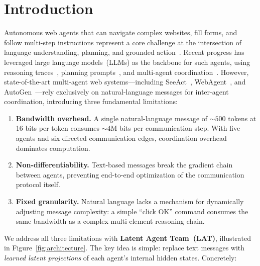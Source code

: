 \documentclass{article}
\newcommand{\ours}{\textsc{LAT}}
\begin{document}
\section{Introduction}
\label{sec:intro}

Autonomous web agents that can navigate complex websites, fill forms, and follow multi-step instructions represent a core challenge at the intersection of language understanding, planning, and grounded action~\cite{deng2024mind2web,zhou2024webarena}.
Recent progress has leveraged large language models~(LLMs) as the backbone for such agents, using reasoning traces~\cite{yao2023react}, planning prompts~\cite{wang2023plan}, and multi-agent coordination~\cite{wu2023autogen,hong2023metagpt}.
However, state-of-the-art multi-agent web systems---including SeeAct~\cite{zheng2024seeact}, WebAgent~\cite{gur2024webagent}, and AutoGen~\cite{wu2023autogen}---rely exclusively on natural-language messages for inter-agent coordination, introducing three fundamental limitations:

\begin{enumerate}[leftmargin=*,itemsep=1pt,topsep=2pt]
\item \textbf{Bandwidth overhead.} A single natural-language message of ${\sim}500$ tokens at 16 bits per token consumes ${\sim}4$M bits per communication step.  With five agents and six directed communication edges, coordination overhead dominates computation.
\item \textbf{Non-differentiability.} Text-based messages break the gradient chain between agents, preventing end-to-end optimization of the communication protocol itself.
\item \textbf{Fixed granularity.} Natural language lacks a mechanism for dynamically adjusting message complexity: a simple ``click OK'' command consumes the same bandwidth as a complex multi-element reasoning chain.
\end{enumerate}

We address all three limitations with \textbf{Latent Agent Team~(\ours{})}, illustrated in Figure~\ref{fig:architecture}.  The key idea is simple: replace text messages with \emph{learned latent projections} of each agent's internal hidden states.  Concretely:
\end{document}
